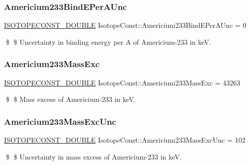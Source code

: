 \subsubsection{\texorpdfstring{Americium233\+Bind\+E\+Per\+A\+Unc}{Americium233BindEPerAUnc}}
{\footnotesize\ttfamily \mbox{\hyperlink{group___isotope_const-_macros_ga8f45a7272ce02c0b4c65c44636ed719a}{I\+S\+O\+T\+O\+P\+E\+C\+O\+N\+S\+T\+\_\+\+D\+O\+U\+B\+LE}} Isotope\+Const\+::\+Americium233\+Bind\+E\+Per\+A\+Unc = 0}

\$ \$ Uncertainty in binding energy per A of Americium-\/233 in keV. \mbox{\label{group___isotope_const-_americium-_am233_ga3d1a86d5bfacb962c81e715ead07deb9}} 
\subsubsection{\texorpdfstring{Americium233\+Mass\+Exc}{Americium233MassExc}}
{\footnotesize\ttfamily \mbox{\hyperlink{group___isotope_const-_macros_ga8f45a7272ce02c0b4c65c44636ed719a}{I\+S\+O\+T\+O\+P\+E\+C\+O\+N\+S\+T\+\_\+\+D\+O\+U\+B\+LE}} Isotope\+Const\+::\+Americium233\+Mass\+Exc = 43263}

\$ \$ Mass excess of Americium-\/233 in keV. \mbox{\label{group___isotope_const-_americium-_am233_gaf5799d9188749d427b9b87a5a7954f40}} 
\subsubsection{\texorpdfstring{Americium233\+Mass\+Exc\+Unc}{Americium233MassExcUnc}}
{\footnotesize\ttfamily \mbox{\hyperlink{group___isotope_const-_macros_ga8f45a7272ce02c0b4c65c44636ed719a}{I\+S\+O\+T\+O\+P\+E\+C\+O\+N\+S\+T\+\_\+\+D\+O\+U\+B\+LE}} Isotope\+Const\+::\+Americium233\+Mass\+Exc\+Unc = 102}

\$ \$ Uncertainty in mass excess of Americium-\/233 in keV. \mbox{\label{group___isotope_const-_americium-_am233_gad1c474a6c33e84d248d11b6d71c202a8}} 
